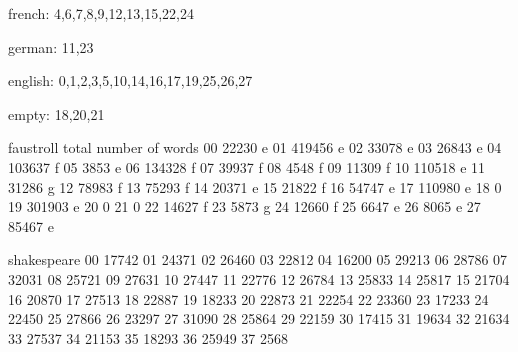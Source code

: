 \documentclass[11pt]{thesis} %
\begin{document}
french: 
4,6,7,8,9,12,13,15,22,24

german:
11,23

english:
0,1,2,3,5,10,14,16,17,19,25,26,27

empty:
18,20,21

faustroll total number of words
00 22230 e
01 419456 e
02 33078 e
03 26843 e
04 103637 f
05 3853 e
06 134328 f
07 39937 f
08 4548 f
09 11309 f
10 110518 e
11 31286 g
12 78983 f
13 75293 f
14 20371 e
15 21822 f
16 54747 e
17 110980 e
18 0
19 301903 e
20 0
21 0
22 14627 f
23 5873 g
24 12660 f
25 6647 e
26 8065 e
27 85467 e


shakespeare
00 17742
01 24371
02 26460
03 22812
04 16200
05 29213
06 28786
07 32031
08 25721
09 27631
10 27447
11 22776
12 26784
13 25833
14 25817
15 21704
16 20870
17 27513
18 22887
19 18233
20 22873
21 22254
22 23360
23 17233
24 22450
25 27866
26 23297
27 31090
28 25864
29 22159
30 17415
31 19634
32 21634
33 27537
34 21153
35 18293
36 25949
37 2568
\end{document}
